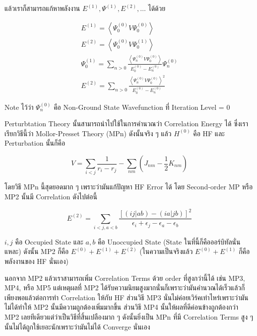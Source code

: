 แล้วเราก็สามารถแก้หาพลังงาน $E^{(1)}, \Psi^{(1)}, E^{(2)}, \dots$ ได้ด้วย

\begin{gather}
    E^{(1)} = \left\langle\Psi_0^{(0)} V \Psi_0^{(0)}\right\rangle \\
    E^{(2)} = \left\langle\Psi_0^{(0)} V \Psi_0^{(1)}\right\rangle \\
    \Psi_0^{(1)} = \sum_{n>0} \frac{\left\langle\Psi_n^{(0)} V \Psi_0^{(0)}\right\rangle}
    {E_0^{(0)}-E_n^{(0)}} \Psi_n^{(0)} \\
    E^{(2)} = \sum_{n>0} \frac{\left\langle\Psi_n^{(0)} V \Psi_0^{(0)}\right\rangle^2}
    {E_0^{(0)}-E_n^{(0)}}
\end{gather}

Note ไว้ว่า $\Psi^{(0)}_{n}$ คือ Non-Ground State Wavefunction ที่ Iteration Level = 0

Perturbtation Theory นั้นสามารถนำไปใช้ในการคำนวณว่า Correlation Energy ได้ ซึ่งเราเรียกวิธีนี้ว่า
Mollor-Presset Theory (MPn) ดังนั้นจริง ๆ แล้ว $H^{(0)}$ คือ HF และ Perturbation นั้นก็คือ

\begin{equation}
    V = \sum_{i < j} \frac{1}{r_{i} - r_{j}} - \sum_{nm} (J_{nm} - \frac{1}{2}K_{nm})
\end{equation}

โดยวิธี MPn นี้สุดยอดมาก ๆ เพราะว่ามันแก้ปัญหา HF Error ได้ โดย Second-order MP หรือ MP2 นั้นมี
Correlation ดังไปต่อนี้

\begin{equation}
    E^{(2)} = \sum_{i<j,a<b} \frac{[(ij|ab) - (ia|jb)]^{2}}
    {\epsilon_{i} + \epsilon_{j} - \epsilon_{a} - \epsilon_{b}}
\end{equation}

\noindent $i,j$ คือ Occupied State และ $a,b$ คือ Unoccupied State (State ในที่นี้ก็คือออร์บิทัลนั่นแหละ)
ดังนั้น MP2 ก็คือ $E^{(0)} + E^{(1)} + E^{(2)}$ (ในความเป็นจริงแล้ว $E^{(0)} + E^{(1)}$ ก็คือพลังงานของ
HF นั่นเอง)

นอกจาก MP2 แล้วเราสามารถเพิ่ม Correlation Terms ด้วย order ที่สูงกว่านี้ได้ เช่น MP3, MP4, หรือ MP5
แต่เหตุผลที่ MP2 ได้รับความนิยมสูงมากนั่นก็เพราะว่ามันคำนวณได้เร็วแล้วก็เพียงพอแล้วต่อการทำ Correlation
ให้กับ HF ส่วนวิธี MP3 นั่นไม่ค่อยเวิร์คเท่าไหร่เพราะว่ามันไม่ได้ทำให้ MP2 นั้นมีความถูกต้องเพิ่มมากขึ้น ส่วนวิธี MP4
นั้นให้ผลที่ดีค่อนข้างถูกต้องกว่า MP2 เลยทีเดียวแต่ว่าเป็นวิธีที่สิ้นเปลืองมาก ๆ ดังนั้นยิ่งเป็น MPn ที่มี Correlation Terms
สูง ๆ นั้นไม่ได้ถูกใช้เยอะนักเพราะว่ามันไม่ได้ Converge นั่นเอง

